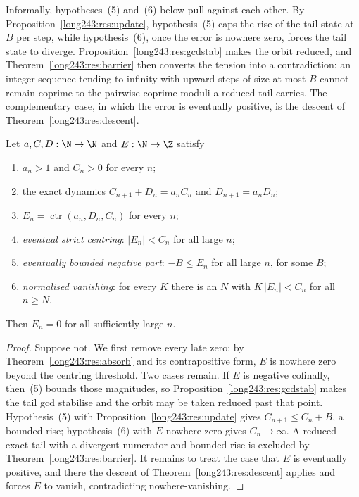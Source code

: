 \documentclass[11pt]{article}
\newcommand{\ctr}{\operatorname{ctr}}
\begin{document}
Informally, hypotheses~(5) and~(6) below pull against each other.  By
Proposition~\ref{long243:res:update}, hypothesis~(5) caps the rise of the tail state at
$B$ per step, while hypothesis~(6), once the error is nowhere zero, forces the
tail state to diverge.  Proposition~\ref{long243:res:gcdstab} makes the orbit reduced,
and Theorem~\ref{long243:res:barrier} then converts the tension into a contradiction:
an integer sequence tending to infinity with upward steps of size at most $B$
cannot remain coprime to the pairwise coprime moduli a reduced tail carries.
The
complementary case, in which the error is eventually positive, is the descent
of Theorem~\ref{long243:res:descent}.

\begin{theorem}\label{long243:res:bounded}
Let $a,C,D:\N\to\N$ and $E:\N\to\Z$ satisfy
\begin{enumerate}
\item $a_n>1$ and $C_n>0$ for every $n$;
\item the exact dynamics $C_{n+1}+D_n=a_nC_n$ and $D_{n+1}=a_nD_n$;
\item $E_n=\ctr(a_n,D_n,C_n)$ for every $n$;
\item \emph{eventual strict centring}: $|E_n|<C_n$ for all large $n$;
\item \emph{eventually bounded negative part}: $-B\le E_n$ for all large $n$,
for some $B$;
\item \emph{normalised vanishing}: for every $K$ there is an $N$ with
$K\,|E_n|<C_n$ for all $n\ge N$.
\end{enumerate}
Then $E_n=0$ for all sufficiently large $n$.
\end{theorem}

\begin{proof}
Suppose not.  We first remove every late zero: by Theorem~\ref{long243:res:absorb} and
its contrapositive form, $E$ is nowhere zero beyond the centring threshold.
Two cases remain.  If $E$ is negative cofinally,
then~(5) bounds those magnitudes, so Proposition~\ref{long243:res:gcdstab} makes the
tail gcd stabilise and the orbit may be taken reduced past that point.
Hypothesis~(5) with
Proposition~\ref{long243:res:update} gives $C_{n+1}\le C_n+B$, a bounded rise;
hypothesis~(6) with $E$ nowhere zero gives $C_n\to\infty$.  A reduced exact
tail with a divergent numerator and bounded rise is excluded by
Theorem~\ref{long243:res:barrier}.  It remains to treat the case that $E$ is eventually
positive, and there the descent
of Theorem~\ref{long243:res:descent} applies and forces $E$ to vanish, contradicting
nowhere-vanishing.
\end{proof}
\end{document}

